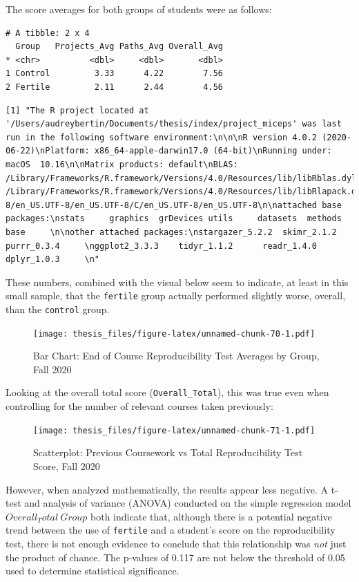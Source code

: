 \documentclass[12pt,twoside]{reedthesis}
\begin{document}
The score averages for both groups of students were as follows:
\begin{verbatim}
# A tibble: 2 x 4
  Group   Projects_Avg Paths_Avg Overall_Avg
* <chr>          <dbl>     <dbl>       <dbl>
1 Control         3.33      4.22        7.56
2 Fertile         2.11      2.44        4.56
\end{verbatim}
\begin{verbatim}
[1] "The R project located at '/Users/audreybertin/Documents/thesis/index/project_miceps' was last run in the following software environment:\n\n\nR version 4.0.2 (2020-06-22)\nPlatform: x86_64-apple-darwin17.0 (64-bit)\nRunning under: macOS  10.16\n\nMatrix products: default\nBLAS:   /Library/Frameworks/R.framework/Versions/4.0/Resources/lib/libRblas.dylib\nLAPACK: /Library/Frameworks/R.framework/Versions/4.0/Resources/lib/libRlapack.dylib\n\nlocale:\nen_US.UTF-8/en_US.UTF-8/en_US.UTF-8/C/en_US.UTF-8/en_US.UTF-8\n\nattached base packages:\nstats     graphics  grDevices utils     datasets  methods   base     \n\nother attached packages:\nstargazer_5.2.2  skimr_2.1.2      purrr_0.3.4     \nggplot2_3.3.3    tidyr_1.1.2      readr_1.4.0      dplyr_1.0.3     \n"
\end{verbatim}
These numbers, combined with the visual below seem to indicate, at least in this small sample, that the \texttt{fertile} group actually performed slightly worse, overall, than the \texttt{control} group.
\begin{figure}
\centering
\texttt{[image: thesis\_files/figure-latex/unnamed-chunk-70-1.pdf]}
\caption{\label{fig:unnamed-chunk-70}Bar Chart: End of Course Reproducibility Test Averages by Group, Fall 2020}
\end{figure}
Looking at the overall total score (\texttt{Overall\_Total}), this was true even when controlling for the number of relevant courses taken previously:
\begin{figure}
\centering
\texttt{[image: thesis\_files/figure-latex/unnamed-chunk-71-1.pdf]}
\caption{\label{fig:unnamed-chunk-71}Scatterplot: Previous Coursework vs Total Reproducibility Test Score, Fall 2020}
\end{figure}
However, when analyzed mathematically, the results appear less negative. A t-test and analysis of variance (ANOVA) conducted on the simple regression model \(Overall_Total ~ Group\) both indicate that, although there is a potential negative trend between the use of \texttt{fertile} and a student's score on the reproducibility test, there is not enough evidence to conclude that this relationship was \emph{not} just the product of chance. The p-values of 0.117 are not below the threshold of 0.05 used to determine statistical significance.
\end{document}
